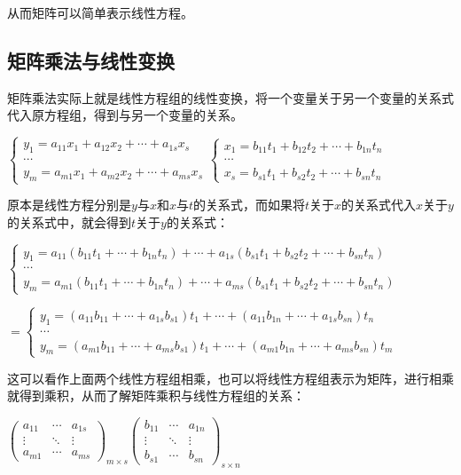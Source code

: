 从而矩阵可以简单表示线性方程。

\subsection{矩阵乘法与线性变换}

矩阵乘法实际上就是线性方程组的线性变换，将一个变量关于另一个变量的关系式代入原方程组，得到与另一个变量的关系。

$\begin{cases}
    y_1=a_{11}x_1+a_{12}x_2+\cdots+a_{1s}x_s \\
    \cdots \\
    y_m=a_{m1}x_1+a_{m2}x_2+\cdots+a_{ms}x_s
\end{cases}\begin{cases}
    x_1=b_{11}t_1+b_{12}t_2+\cdots+b_{1n}t_n \\
    \cdots \\
    x_s=b_{s1}t_1+b_{s2}t_2+\cdots+b_{sn}t_n
\end{cases}$\medskip

原本是线性方程分别是$y$与$x$和$x$与$t$的关系式，而如果将$t$关于$x$的关系式代入$x$关于$y$的关系式中，就会得到$t$关于$y$的关系式：\medskip

$\begin{cases}
    y_1=a_{11}(b_{11}t_1+\cdots+b_{1n}t_n)+\cdots+a_{1s}(b_{s1}t_1+b_{s2}t_2+\cdots+b_{sn}t_n) \\
    \cdots \\
    y_m=a_{m1}(b_{11}t_1+\cdots+b_{1n}t_n)+\cdots+a_{ms}(b_{s1}t_1+b_{s2}t_2+\cdots+b_{sn}t_n)
\end{cases}$

$=\begin{cases}
    y_1=(a_{11}b_{11}+\cdots+a_{1s}b_{s1})t_1+\cdots+(a_{11}b_{1n}+\cdots+a_{1s}b_{sn})t_n \\
    \cdots \\
    y_m=(a_{m1}b_{11}+\cdots+a_{ms}b_{s1})t_1+\cdots+(a_{m1}b_{1n}+\cdots+a_{ms}b_{sn})t_m
\end{cases}$ \medskip

这可以看作上面两个线性方程组相乘，也可以将线性方程组表示为矩阵，进行相乘就得到乘积，从而了解矩阵乘积与线性方程组的关系：\medskip


$\left(\begin{array}{ccc}
    a_{11} & \cdots & a_{1s} \\
    \vdots & \ddots & \vdots \\
    a_{m1} & \cdots & a_{ms}
\end{array}\right)_{m\times s}\left(\begin{array}{ccc}
    b_{11} & \cdots & a_{1n} \\
    \vdots & \ddots & \vdots \\
    b_{s1} & \cdots & b_{sn}
\end{array}\right)_{s\times n}$

